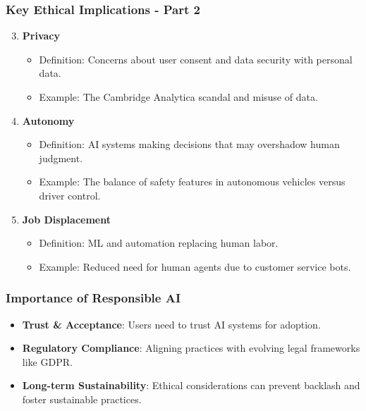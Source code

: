 \documentclass[aspectratio=169]{beamer}
\begin{document}
\begin{frame}[fragile]
    \frametitle{Key Ethical Implications - Part 2}
    \begin{enumerate}
        \setcounter{enumi}{2} %
        \item \textbf{Privacy}
        \begin{itemize}
            \item Definition: Concerns about user consent and data security with personal data.
            \item Example: The Cambridge Analytica scandal and misuse of data.
        \end{itemize}

        \item \textbf{Autonomy}
        \begin{itemize}
            \item Definition: AI systems making decisions that may overshadow human judgment.
            \item Example: The balance of safety features in autonomous vehicles versus driver control.
        \end{itemize}

        \item \textbf{Job Displacement}
        \begin{itemize}
            \item Definition: ML and automation replacing human labor.
            \item Example: Reduced need for human agents due to customer service bots.
        \end{itemize}
    \end{enumerate}
\end{frame}

\begin{frame}[fragile]
    \frametitle{Importance of Responsible AI}
    \begin{itemize}
        \item \textbf{Trust \& Acceptance}: Users need to trust AI systems for adoption.
        \item \textbf{Regulatory Compliance}: Aligning practices with evolving legal frameworks like GDPR.
        \item \textbf{Long-term Sustainability}: Ethical considerations can prevent backlash and foster sustainable practices.
    \end{itemize}
\end{frame}
\end{document}
